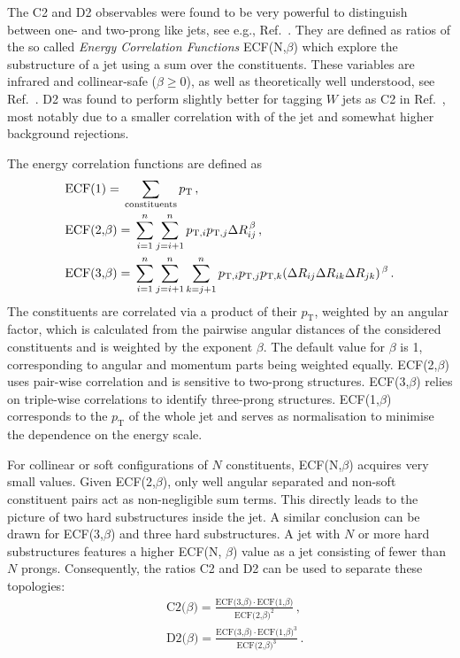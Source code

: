 The C2 and D2 observables were found to be very powerful to distinguish between one- and two-prong like jets, see e.g., Ref.~\cite{bib:power_counting}. They are defined as ratios of the so called \textit{Energy Correlation Functions} ECF(N,$\beta$) which explore the substructure of a jet using a sum over the constituents. These variables are infrared and collinear-safe ($\beta\ge0$), as well as theoretically well understood, see Ref.~\cite{bib:analytic_ECF}. D2 was found to perform slightly better for tagging $W$ jets as C2 in Ref.~\cite{bib:w_tagging}, most notably due to a smaller correlation with \pt of the jet and somewhat higher background rejections. 

The energy correlation functions are defined as
\begin{equation}
\begin{aligned}
 & \text{ECF(1)}  ={} \sum\limits_{\rm constituents} p_{\mathrm{T}}\,, \\ 
 & \text{ECF(2,$\beta$)} ={} \sum\limits_{i=1}^n \sum\limits_{j=i+1}^n p_{\mathrm{T},i}p_{\mathrm{T},j}\Delta R_{ij}^{\,\beta}\,, \\ 
 & \text{ECF(3,$\beta$)} ={} \sum\limits_{i=1}^n \sum\limits_{j=i+1}^n \sum\limits_{k=j+1}^n p_{\mathrm{T},i}p_{\mathrm{T},j}p_{\mathrm{T},k}(\Delta R_{ij} \Delta R_{ik} \Delta R_{jk})^{\,\beta}\,.
\end{aligned}
\end{equation}\label{eq:ECF}
The constituents are correlated via a product of their $p_{\mathrm{T}}$, weighted by an angular factor, which is calculated from the pairwise angular distances of the considered constituents and is weighted by the exponent $\beta$. The default value for $\beta$ is 1, corresponding to angular and momentum parts being weighted equally. ECF(2,$\beta$) uses pair-wise correlation and is sensitive to two-prong structures. ECF(3,$\beta$) relies on triple-wise correlations to identify three-prong structures. ECF(1,$\beta$) corresponds to the $p_{\mathrm{T}}$ of the whole jet and serves as normalisation to minimise the dependence on the energy scale.


For collinear or soft configurations of $N$ constituents, ECF(N,$\beta$) acquires very small values. Given ECF(2,$\beta$), only well angular separated and non-soft constituent pairs act as non-negligible sum terms. This directly leads to the picture of two hard substructures inside the jet. A similar conclusion can be drawn for ECF(3,$\beta$) and three hard substructures. A jet with $N$ or more hard substructures features a higher ECF(N, $\beta$) value as a jet consisting of fewer than $N$ prongs. Consequently, the ratios C2 and D2 can be used to separate these topologies:
\begin{equation}
\begin{aligned}
 & \text{C2($\beta$)} ={} \frac{\text{ECF(3,$\beta$)}\cdot\text{ECF(1,$\beta$)}}{\text{ECF(2,$\beta$)}^2}\,,\\ 
 & \text{D2($\beta$)} ={} \frac{\text{ECF(3,$\beta$)}\cdot\text{ECF(1,$\beta$)}^3}{\text{ECF(2,$\beta$)}^3}\,.
\end{aligned}
\end{equation}\label{eq:C2D2} 


